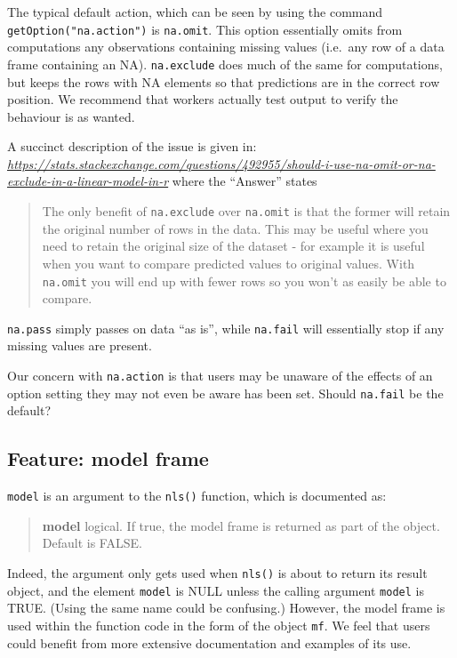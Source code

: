 \documentclass[
]{article}
\begin{document}
The typical default action, which can be seen by using the command
\texttt{getOption("na.action")} is \texttt{na.omit}. This option
essentially omits from computations any observations containing missing
values (i.e.~any row of a data frame containing an NA).
\texttt{na.exclude} does much of the same for computations, but keeps
the rows with NA elements so that predictions are in the correct row
position. We recommend that workers actually test output to verify the
behaviour is as wanted.

A succinct description of the issue is given in:
\emph{\url{https://stats.stackexchange.com/questions/492955/should-i-use-na-omit-or-na-exclude-in-a-linear-model-in-r}}
where the ``Answer'' states

\begin{quote}
The only benefit of \texttt{na.exclude} over \texttt{na.omit} is that
the former will retain the original number of rows in the data. This may
be useful where you need to retain the original size of the dataset -
for example it is useful when you want to compare predicted values to
original values. With \texttt{na.omit} you will end up with fewer rows
so you won't as easily be able to compare.
\end{quote}

\texttt{na.pass} simply passes on data ``as is'', while \texttt{na.fail}
will essentially stop if any missing values are present.

Our concern with \texttt{na.action} is that users may be unaware of the
effects of an option setting they may not even be aware has been set.
Should \texttt{na.fail} be the default?

\hypertarget{feature-model-frame}{%
\subsection{Feature: model frame}\label{feature-model-frame}}

\texttt{model} is an argument to the \texttt{nls()} function, which is
documented as:

\begin{quote}
\textbf{model} logical. If true, the model frame is returned as part of
the object. Default is FALSE.
\end{quote}

Indeed, the argument only gets used when \texttt{nls()} is about to
return its result object, and the element \texttt{model} is NULL unless
the calling argument \texttt{model} is TRUE. (Using the same name could
be confusing.) However, the model frame is used within the function code
in the form of the object \texttt{mf}. We feel that users could benefit
from more extensive documentation and examples of its use.
\end{document}
